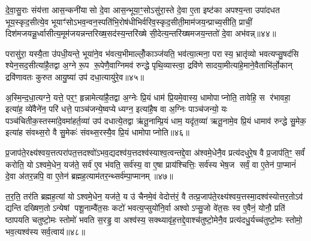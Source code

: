 {\anuvakamend[{ए॒वं प्रा॒प्नोत्या॑दि॒त्या अ॑र्धय॒त्येका॒न्नप॑ञ्चा॒शच्च॑॥10॥}]}

दे॒वा॒सु॒राः संय॑त्ता आस॒न्कनी॑यासो दे॒वा आस॒न्भूया॒ꣳ॒सोऽसु॑रा॒स्ते दे॒वा ए॒ता इष्ट॑का अपश्य॒न्ता उपा॑दधत भूय॒स्कृद॒सीत्ये॒व भूयाꣳ॑सोऽभव॒न्वन॒स्पति॑भि॒रोष॑धीभिर्वरिव॒स्कृद॒सीती॒माम॑जय॒न्प्राच्य॒सीति॒ प्राचीं॒ दिश॑मजयन्नू॒र्ध्वासीत्य॒मूम॑जयन्नन्तरिख्ष॒सद॑स्य॒न्तरि॑ख्षे सी॒देत्य॒न्तरि॑ख्षमजय॒न्ततो॑ दे॒वा अभ॑वन्न्॥४४॥

परासु॑रा॒ यस्यै॒ता उ॑पधी॒यन्ते॒ भूया॑ने॒व भ॑वत्य॒भीमाल्लोँ॒काञ्ज॑यति॒ भव॑त्या॒त्मना॒ परास्य॒ भ्रातृ॑व्यो भवत्यप्सु॒षद॑सि श्येन॒सद॒सीत्या॑है॒तद्वा अ॒ग्ने रू॒प रू॒पेणै॒वाग्निमव॑ रुन्द्धे पृथि॒व्यास्त्वा॒ द्रवि॑णे सादया॒मीत्या॑हे॒माने॒वैताभि॑र्लो॒कान् द्रवि॑णावतः कुरुत आयु॒ष्या॑ उप॑ दधा॒त्यायु॑रे॒व॥४५॥

अ॒स्मि॒न्द॒धा॒त्यग्ने॒ यत्ते॒ पर॒ꣳ॒ हृन्नामेत्या॑है॒तद्वा अ॒ग्नेः प्रि॒यं धाम॑ प्रि॒यमे॒वास्य॒ धामोपाप्नोति॒ तावेहि॒ स र॑भावहा॒ इत्या॑ह॒ व्ये॑वैने॑न॒ परि॑ धत्ते॒ पाञ्च॑जन्ये॒ष्वप्येध्यग्न॒ इत्या॑है॒ष वा अ॒ग्निः पाञ्च॑जन्यो॒ यः पञ्च॑चितीक॒स्तस्मा॑दे॒वमा॑हर्त॒व्या॑ उप॑ दधात्ये॒तद्वा ऋ॑तू॒नाम्प्रि॒यं धाम॒ यदृ॑त॒व्या॑ ऋतू॒नामे॒व प्रि॒यं धामाव॑ रुन्द्धे सु॒मेक॒ इत्या॑ह संवथ्स॒रो वै सु॒मेकः॑ संवथ्स॒रस्यै॒व प्रि॒यं धामोपाप्नोति॥४६॥

{\anuvakamend[{अभ॑व॒न्नायु॑रे॒वर्त॒व्या॑ उप॒ षड्विꣳ॑शतिश्च॥11॥}]}

प्र॒जाप॑ते॒रक्ष्य॑श्वय॒त्तत्परा॑पत॒त्तदश्वो॑ऽभव॒द्यदश्व॑य॒त्तदश्व॑स्याश्व॒त्वन्तद्दे॒वा अ॑श्वमे॒धेनै॒व प्रत्य॑दधुरे॒ष वै प्र॒जाप॑ति॒ꣳ॒ सर्वं॑ करोति॒ योऽश्वमे॒धेन॒ यज॑ते॒ सर्व॑ ए॒व भ॑वति॒ सर्व॑स्य॒ वा ए॒षा प्राय॑श्चित्तिः॒ सर्व॑स्य भेष॒ज सर्वं॒ वा ए॒तेन॑ पा॒प्मानं॑ दे॒वा अ॑तर॒न्नपि॒ वा ए॒तेन॑ ब्रह्मह॒त्याम॑तर॒न्थ्सर्व॑म्पा॒प्मानम्॥४७॥

त॒र॒ति॒ तर॑ति ब्रह्मह॒त्यां योऽश्वमे॒धेन॒ यज॑ते॒ य उ॑ चैनमे॒वं वेदोत्त॑रं॒ वै तत्प्र॒जाप॑ते॒रक्ष्य॑श्वय॒त्तस्मा॒दश्व॑स्योत्तर॒तोऽव॑ द्यन्ति दख्षिण॒तोऽन्येषां पशू॒नाम्वै॑त॒सः कटो॑ भवत्य॒प्सुयो॑नि॒र्वा अश्वोऽप्सु॒जो वे॑त॒सः स्व ए॒वैनं॒ योनौ॒ प्रति॑ ष्ठापयति चतुष्टो॒मः स्तोमो॑ भवति स॒रड्ढ॒ वा अश्व॑स्य॒ सक्थ्यावृ॑ह॒त्तद्दे॒वाश्च॑तुष्टो॒मेनै॒व प्रत्य॑दधु॒र्यच्च॑तुष्टो॒मः स्तोमो॒ भव॒त्यश्व॑स्य सर्व॒त्वाय॑॥४८॥

{\anuvakamend[{सर्वं॑ पा॒प्मान॑मवृह॒द्द्वाद॑श च॥12॥}]}


{}

